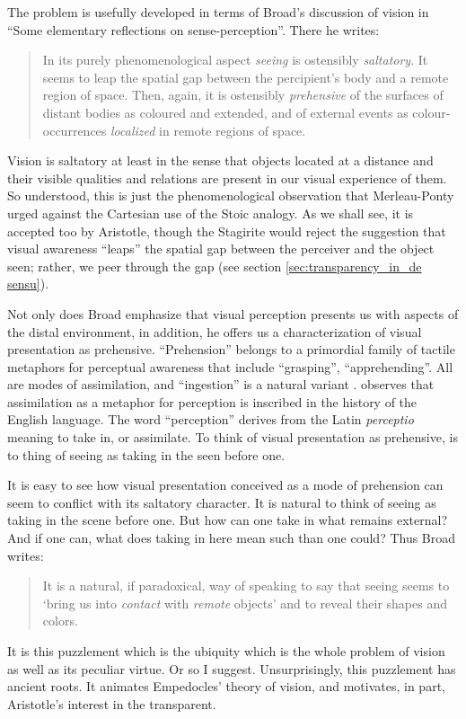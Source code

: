 \documentclass[12pt]{article}
\begin{document}
The problem is usefully developed in terms of Broad's discussion of vision in ``Some elementary reflections on sense-perception''. There he writes:
\begin{quote}
	In its purely phenomenological aspect \emph{seeing} is ostensibly \emph{saltatory}. It seems to leap the spatial gap between the percipient's body and a remote region of space. Then, again, it is ostensibly \emph{prehensive} of the surfaces of distant bodies as coloured and extended, and of external events as colour-occurrences \emph{localized} in remote regions of space. \citep[5]{Broad:1952kx}
\end{quote}
Vision is saltatory at least in the sense that objects located at a distance and their visible qualities and relations are present in our visual experience of them. So understood, this is just the phenomenological observation that Merleau-Ponty urged against the Cartesian use of the Stoic analogy. As we shall see, it is accepted too by Aristotle, though the Stagirite would reject the suggestion that visual awareness ``leaps'' the spatial gap between the perceiver and the object seen; rather, we peer through the gap (see section \ref{sec:transparency_in_de sensu}). 

Not only does Broad emphasize that visual perception presents us with aspects of the distal environment, in addition, he offers us a characterization of visual presentation as prehensive. ``Prehension'' belongs to a primordial family of tactile metaphors for perceptual awareness that include ``grasping'', ``apprehending''. All are modes of assimilation, and ``ingestion'' is a natural variant \citep[see][7]{Johnston:2006uq,Price:1932fk}. \citet{Burnyeat:1979mv} observes that assimilation as a metaphor for perception is inscribed in the history of the English language. The word ``perception'' derives from the Latin \emph{perceptio} meaning to take in, or assimilate. To think of visual presentation as prehensive, is to thing of seeing as taking in the seen before one.

It is easy to see how visual presentation conceived as a mode of prehension can seem to conflict with its saltatory character. It is natural to think of seeing as taking in the scene before one. But how can one take in what remains external? And if one can, what does taking in here mean such than one could? Thus Broad writes:
\begin{quote}
	It is a natural, if paradoxical, way of speaking to say that seeing seems to `bring us into \emph{contact} with \emph{remote} objects' and to reveal their shapes and colors. \citep[33]{Broad:1952kx}
\end{quote}
It is this puzzlement which is the ubiquity which is the whole problem of vision as well as its peculiar virtue. Or so I suggest. Unsurprisingly, this puzzlement has ancient roots. It animates Empedocles' theory of vision, and motivates, in part, Aristotle's interest in the transparent.
\end{document}
